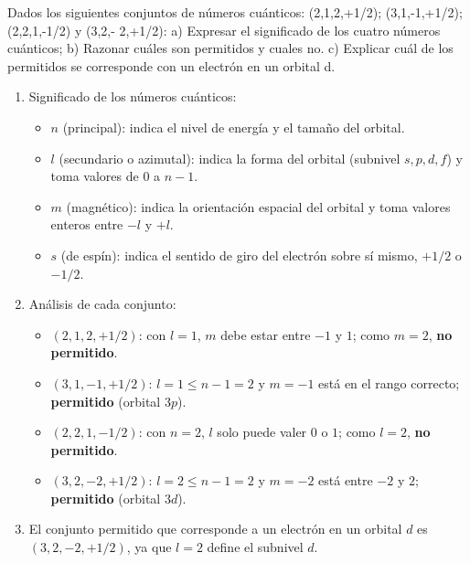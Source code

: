 \begin{exercise}
    Dados los siguientes conjuntos de números cuánticos: (2,1,2,+1/2); (3,1,-1,+1/2); (2,2,1,-1/2) y (3,2,- 2,+1/2): a) Expresar el significado de los cuatro números cuánticos; b) Razonar cuáles son permitidos y cuales no.
    c) Explicar cuál de los permitidos se corresponde con un electrón en un orbital d.

    \begin{solu}
        \begin{enumerate}[label=\letraminuscula]
            \item Significado de los números cuánticos:
            \begin{itemize}
                \item \(n\) (principal): indica el nivel de energía y el tamaño del orbital.
                \item \(l\) (secundario o azimutal): indica la forma del orbital (subnivel \(s,p,d,f\)) y toma valores de \(0\) a \(n-1\).
                \item \(m\) (magnético): indica la orientación espacial del orbital y toma valores enteros entre \(-l\) y \(+l\).
                \item \(s\) (de espín): indica el sentido de giro del electrón sobre sí mismo, \(+1/2\) o \(-1/2\).
            \end{itemize}
            \item Análisis de cada conjunto:
            \begin{itemize}
                \item \((2,1,2,+1/2)\): con \(l=1\), \(m\) debe estar entre \(-1\) y \(1\); como \(m=2\), \textbf{no permitido}.
                \item \((3,1,-1,+1/2)\): \(l=1\leq n-1=2\) y \(m=-1\) está en el rango correcto; \textbf{permitido} (orbital \(3p\)).
                \item \((2,2,1,-1/2)\): con \(n=2\), \(l\) solo puede valer \(0\) o \(1\); como \(l=2\), \textbf{no permitido}.
                \item \((3,2,-2,+1/2)\): \(l=2\leq n-1=2\) y \(m=-2\) está entre \(-2\) y \(2\); \textbf{permitido} (orbital \(3d\)).
            \end{itemize}
            \item El conjunto permitido que corresponde a un electrón en un orbital \(d\) es \((3,2,-2,+1/2)\), ya que \(l=2\) define el subnivel \(d\).
        \end{enumerate}
    \end{solu}
\end{exercise}

